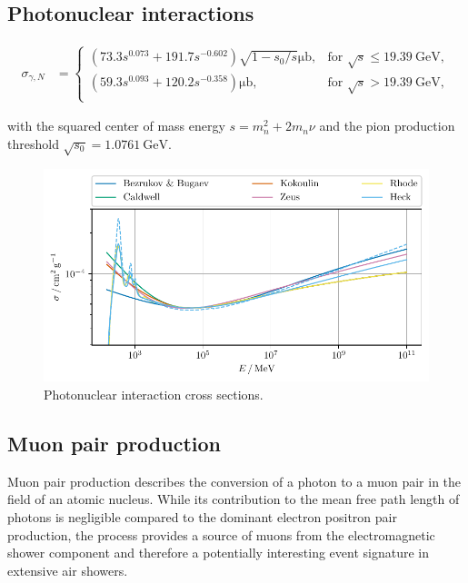 \subsection{Photonuclear interactions}


\begin{align}
	\label{eqn:photonuclear_C7}
	\sigma_{\gamma,N} &=
	\begin{cases}
		\left(73.3 s^{0.073} + 191.7 s^{-0.602} \right) \sqrt{1 - s_0 / s} \si{\micro\barn}, & \text{for } \sqrt{s} \leq \SI{19.39}{\giga\electronvolt}, \\
		\left( 59.3 s^{0.093} + 120.2 s^{-0.358} \right) \si{\micro\barn}, & \text{for } \sqrt{s} > \SI{19.39}{\giga\electronvolt}, \\
	\end{cases}
\end{align} 

with the squared center of mass energy $s = m_n^2 + 2 m_n \nu$ and the pion production threshold $\sqrt{s_0} = \SI{1.0761}{\giga\electronvolt}$.


\begin{figure}
	\centering
    \includegraphics{plots/photoproduction_cross.pdf}
    \caption{Photonuclear interaction cross sections.}
    \label{fig:photoproduction_cross}
\end{figure}


\subsection{Muon pair production}

Muon pair production describes the conversion of a photon to a muon pair in the field of an atomic nucleus.
While its contribution to the mean free path length of photons is negligible compared to the dominant electron positron pair production, the process provides a source of muons from the electromagnetic shower component and therefore a potentially interesting event signature in extensive air showers.

